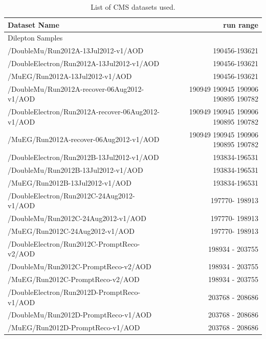 \begin{table}[!ht]
\begin{center}
\caption{List of CMS datasets used.}
\label{tab:afb:datasamples}
{\footnotesize
\begin{tabular}{l|r}
\hline
Dataset Name & run range \\
\hline\hline
Dilepton Samples \\
\hline

  /DoubleMu/Run2012A-13Jul2012-v1/AOD &  190456-193621 \\
  /DoubleElectron/Run2012A-13Jul2012-v1/AOD & 190456-193621  \\
  /MuEG/Run2012A-13Jul2012-v1/AOD & 190456-193621 \\

  /DoubleMu/Run2012A-recover-06Aug2012-v1/AOD & 190949 190945 190906 190895 190782 \\
  /DoubleElectron/Run2012A-recover-06Aug2012-v1/AOD & 190949 190945 190906 190895 190782 \\
  /MuEG/Run2012A-recover-06Aug2012-v1/AOD & 190949 190945 190906 190895 190782\\

  /DoubleElectron/Run2012B-13Jul2012-v1/AOD  & 193834-196531 \\
  /DoubleMu/Run2012B-13Jul2012-v1/AOD  & 193834-196531  \\
  /MuEG/Run2012B-13Jul2012-v1/AOD  & 193834-196531  \\

  /DoubleElectron/Run2012C-24Aug2012-v1/AOD &  197770- 198913 \\
  /DoubleMu/Run2012C-24Aug2012-v1/AOD &  197770- 198913 \\
  /MuEG/Run2012C-24Aug2012-v1/AOD &  197770- 198913 \\

  /DoubleElectron/Run2012C-PromptReco-v2/AOD & 198934 - 203755  \\
  /DoubleMu/Run2012C-PromptReco-v2/AOD &  198934 - 203755 \\
  /MuEG/Run2012C-PromptReco-v2/AOD &  198934 - 203755 \\

  /DoubleElectron/Run2012D-PromptReco-v1/AOD & 203768 - 208686 \\
  /DoubleMu/Run2012D-PromptReco-v1/AOD & 203768 - 208686 \\
  /MuEG/Run2012D-PromptReco-v1/AOD & 203768 - 208686 \\

\hline
\end{tabular}
}
\end{center}
\end{table}

